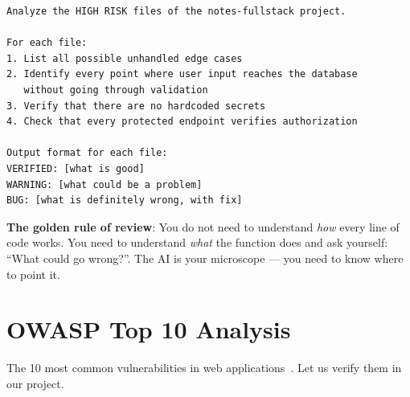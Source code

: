 \begin{praticabox}[title={Practice --- AI-assisted review}]
\begin{lstlisting}[language={}]
Analyze the HIGH RISK files of the notes-fullstack project.

For each file:
1. List all possible unhandled edge cases
2. Identify every point where user input reaches the database
   without going through validation
3. Verify that there are no hardcoded secrets
4. Check that every protected endpoint verifies authorization

Output format for each file:
VERIFIED: [what is good]
WARNING: [what could be a problem]
BUG: [what is definitely wrong, with fix]
\end{lstlisting}
\end{praticabox}

\begin{tipbox}
\textbf{The golden rule of review}: You do not need to understand \textit{how} every line of code works. You need to understand \textit{what} the function does and ask yourself: ``What could go wrong?''. The AI is your microscope --- you need to know where to point it.
\end{tipbox}

\section{OWASP Top 10 Analysis}

The 10 most common vulnerabilities in web applications~\cite{owasp:top10}. Let us verify them in our project.

